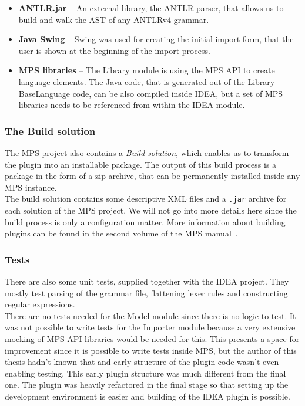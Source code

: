 \begin{itemize}
	\item \textbf{ANTLR.jar} -- An external library, the ANTLR parser, that allows us to build and walk the AST of any ANTLRv4 grammar.
	
	\item \textbf{Java Swing} -- Swing was used for creating the initial import form, that the user is shown at the beginning of the import process.
	
	\item \textbf{MPS libraries} -- The Library module is using the MPS API to create language elements. The Java code, that is generated out of the Library BaseLanguage code, can be also compiled inside IDEA, but a set of MPS libraries needs to be referenced from within the IDEA module.
\end{itemize}

\subsubsection{The Build solution}
\label{chap:the_build_solution}

The MPS project also contains a \textit{Build solution}, which enables us to transform the plugin into an installable package.
The output of this build process is a package in the form of a zip archive, that can be permanently installed inside any MPS instance.
\\

The build solution contains some descriptive XML files and a \texttt{.jar} archive for each solution of the MPS project.
We will not go into more details here since the build process is only a configuration matter.
More information about building plugins can be found in the second volume of the MPS manual~\cite{MPS2}.

\subsubsection{Tests}

There are also some unit tests, supplied together with the IDEA project.
They mostly test parsing of the grammar file, flattening lexer rules and constructing regular expressions.
\\

There are no tests needed for the Model module since there is no logic to test.
It was not possible to write tests for the Importer module because a very extensive mocking of MPS API libraries would be needed for this.
This presents a space for improvement since it is possible to write tests inside MPS, but the author of this thesis hadn't known that and early structure of the plugin code wasn't even enabling testing.
This early plugin structure was much different from the final one.
The plugin was heavily refactored in the final stage so that setting up the development environment is easier and building of the IDEA plugin is possible.


